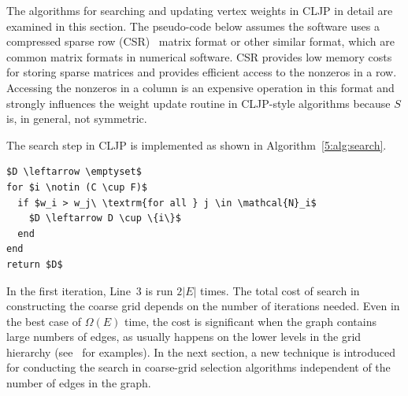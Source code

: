 \documentclass{elsart}
\begin{document}
The algorithms for searching and updating vertex weights in CLJP in
detail are examined in this section. The pseudo-code below assumes the
software uses a compressed sparse row (CSR)~\cite{saadBook} matrix
format or other similar format, which are common matrix formats in
numerical software. CSR provides low memory costs for storing sparse
matrices and provides efficient access to the nonzeros in a
row. Accessing the nonzeros in a column is an expensive operation in
this format and strongly influences the weight update routine in
CLJP-style algorithms because $S$ is, in general, not symmetric.

The search step in CLJP is implemented as shown in
Algorithm~\ref{5:alg:search}.
\begin{lstlisting}[caption={Coarse-Grid Selection Graph Search},label=5:alg:search]
%\textsc{Search-Graph}$(S,\, C,\, F)$%
$D \leftarrow \emptyset$
for $i \notin (C \cup F)$
  if $w_i > w_j\ \textrm{for all } j \in \mathcal{N}_i$
    $D \leftarrow D \cup \{i\}$
  end
end
return $D$
\end{lstlisting}
In the first iteration, Line~3 is run $2|E|$ times. The total cost of
search in constructing the coarse grid depends on the number of
iterations needed. Even in the best case of $\Omega(E)$ time, the cost
is significant when the graph contains large numbers of edges, as
usually happens on the lower levels in the grid hierarchy
(see~\cite{alber-PCGS} for examples). In the next section, a new
technique is introduced for conducting the search in coarse-grid
selection algorithms independent of the number of edges in the graph.
\end{document}
